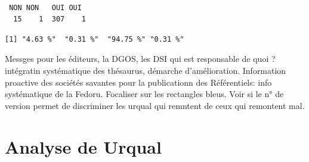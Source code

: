 \documentclass[]{article}
\begin{document}
\begin{verbatim}

 NON NON   OUI OUI  
  15    1  307    1 
\end{verbatim}

\begin{verbatim}
[1] "4.63 %"  "0.31 %"  "94.75 %" "0.31 %" 
\end{verbatim}

Messges pour les éditeurs, la DGOS, les DSI qui est responsable de quoi
? intégratin systématique des thésaurus, démarche d'amélioration.
Information proactive des sociétés savantes pour la publicationn des
Référentiels: info systématique de la Fedoru. Focaliser sur les
rectangles bleus. Voir si le n° de version permet de discriminer les
urqual qui remntent de ceux qui remontent mal.

\section{Analyse de Urqual}\label{analyse-de-urqual}
\end{document}
